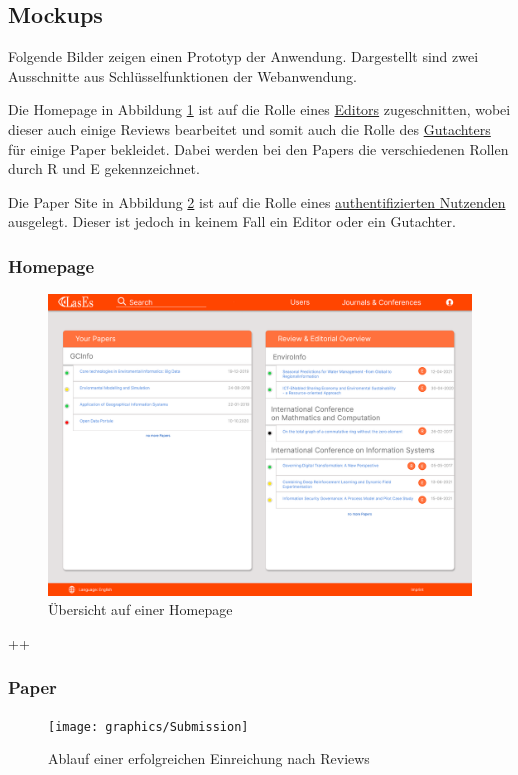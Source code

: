 \subsection{Mockups}

Folgende Bilder zeigen einen Prototyp der Anwendung.
Dargestellt sind zwei Ausschnitte aus Schlüsselfunktionen der Webanwendung.

Die Homepage in Abbildung \ref{fig:homepageMockup} ist auf die Rolle eines \hyperref[glo:editor]{Editors} zugeschnitten, wobei dieser auch einige
Reviews bearbeitet und somit auch die Rolle des \hyperref[glo:gutachter]{Gutachters} für einige Paper bekleidet.
Dabei werden bei den Papers die verschiedenen Rollen durch R und E gekennzeichnet.

Die Paper Site in Abbildung \ref{fig:paperMockup} ist auf die Rolle eines \hyperref[glo:regnutzer]{authentifizierten Nutzenden} ausgelegt.
Dieser ist jedoch in keinem Fall ein Editor oder ein Gutachter.


\subsubsection{Homepage}

\begin{figure}[H]
	\centering
	\includegraphics[width=0.85\linewidth]{graphics/Homepage_png}
	\caption{Übersicht auf einer Homepage}
	\label{fig:homepageMockup}
\end{figure}
++
\subsubsection{Paper}

\begin{figure}[H]
	\centering
	\texttt{[image: graphics/Submission]}
	\caption{Ablauf einer erfolgreichen Einreichung nach Reviews}
	\label{fig:paperMockup}
\end{figure}


